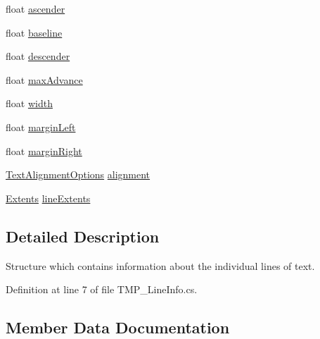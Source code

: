 \begin{DoxyCompactItemize}
float \mbox{\hyperlink{struct_t_m_pro_1_1_t_m_p___line_info_a6d532182b74c4703af35abd5e7a0699c}{ascender}}
\item 
float \mbox{\hyperlink{struct_t_m_pro_1_1_t_m_p___line_info_a1fa19a22a16455f8212e4e7d803acb47}{baseline}}
\item 
float \mbox{\hyperlink{struct_t_m_pro_1_1_t_m_p___line_info_a05552d37339366d37fc255d31e051c1d}{descender}}
\item 
float \mbox{\hyperlink{struct_t_m_pro_1_1_t_m_p___line_info_a98d385a72db2f104c3495148cb3cef55}{max\+Advance}}
\item 
float \mbox{\hyperlink{struct_t_m_pro_1_1_t_m_p___line_info_a83588bf25880d72d2f7296fdbe4788ad}{width}}
\item 
float \mbox{\hyperlink{struct_t_m_pro_1_1_t_m_p___line_info_a9d5bfd42c63189115d59e29cbbfb3635}{margin\+Left}}
\item 
float \mbox{\hyperlink{struct_t_m_pro_1_1_t_m_p___line_info_a0628e316a9d4ae36e2b25e83768c3095}{margin\+Right}}
\item 
\mbox{\hyperlink{namespace_t_m_pro_a1dd743b58b1fd4057c00e4b98ab86301}{Text\+Alignment\+Options}} \mbox{\hyperlink{struct_t_m_pro_1_1_t_m_p___line_info_a352a17cd7468f53cd4947092f7c7c785}{alignment}}
\item 
\mbox{\hyperlink{struct_t_m_pro_1_1_extents}{Extents}} \mbox{\hyperlink{struct_t_m_pro_1_1_t_m_p___line_info_ad02e4f4672f757a4caba50835a5c09b0}{line\+Extents}}
\end{DoxyCompactItemize}


\subsection{Detailed Description}
Structure which contains information about the individual lines of text. 



Definition at line 7 of file T\+M\+P\+\_\+\+Line\+Info.\+cs.



\subsection{Member Data Documentation}
\mbox{\label{struct_t_m_pro_1_1_t_m_p___line_info_a352a17cd7468f53cd4947092f7c7c785}} 
